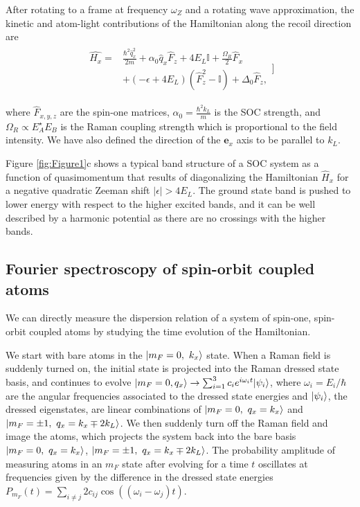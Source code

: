 After rotating to a frame at frequency $\omega_Z$ and a rotating wave approximation, the kinetic and atom-light contributions of the Hamiltonian along the recoil direction are
\begin{align}
\begin{split}
\hat{H_x} = &\frac{\hbar^2\hat{q}_x^2}{2m} + \alpha_0\hat{q}_x\hat{F}_z +4E_L\mathbb{I} + \frac{\Omega_R}{2}\hat{F}_x\\
& +(-\epsilon+4E_L)(\hat{F}_z^2-\mathbb{I}) +\Delta_0\hat{F}_z, 
\label{Eq:SOCone}
\end{split}]
\end{align}	

 where $\hat{F}_{x,y,z}$ are the spin-one matrices,  $\alpha_0=\frac{\hbar^2k_L}{m}$ is the SOC strength, and $\Omega_R\propto E_A^{\star}E_B$ is the Raman coupling strength which is proportional to the field intensity. We have also defined the direction of the $\mathbf{e}_x$ axis to be parallel to $k_L$.
 
Figure \ref{fig:Figure1}c shows a typical band structure of a SOC system as a function of quasimomentum that results of diagonalizing the Hamiltonian $\hat{H}_x$ for a negative quadratic Zeeman shift $|\epsilon|>4E_L$. The ground state band is pushed to lower energy with respect to the higher excited bands, and it can be well described by a harmonic potential as there are no crossings with the higher bands. 

\subsection{Fourier spectroscopy of spin-orbit coupled atoms}		

We can directly measure the dispersion relation of a system of spin-one, spin-orbit coupled atoms by studying the time evolution of the Hamiltonian.

We start with bare atoms in the $|m_F=0,\ k_x\rangle$ state. When a Raman field is suddenly turned on, the initial state is projected into the Raman dressed state basis, and continues to evolve 
$|m_F=0, q_x\rangle\rightarrow \sum_{i=1}^3c_{i}e^{i\omega_it} |\psi_i\rangle$, where $\omega_i=E_i/\hbar$ are the angular frequencies associated to the dressed state energies and $|\psi_i\rangle$, the dressed eigenstates,  are linear combinations of $|m_F=0,\ q_x=k_x\rangle$ and $|m_F=\pm1,\ q_x=k_x\mp2k_L\rangle$. We then suddenly turn off the Raman field and image the atoms, which projects the system back into the bare basis $|m_F=0,\ q_x=k_x\rangle$, $|m_F=\pm1,\ q_x=k_x\mp2k_L\rangle$. The probability amplitude of measuring atoms in an $m_F$ state after evolving for a time $t$ oscillates at frequencies given by the difference in the dressed state energies $P_{m_F}(t)=\sum\limits_{i\neq j} 2c_{ij}\cos((\omega_i-\omega_j)t)$.

